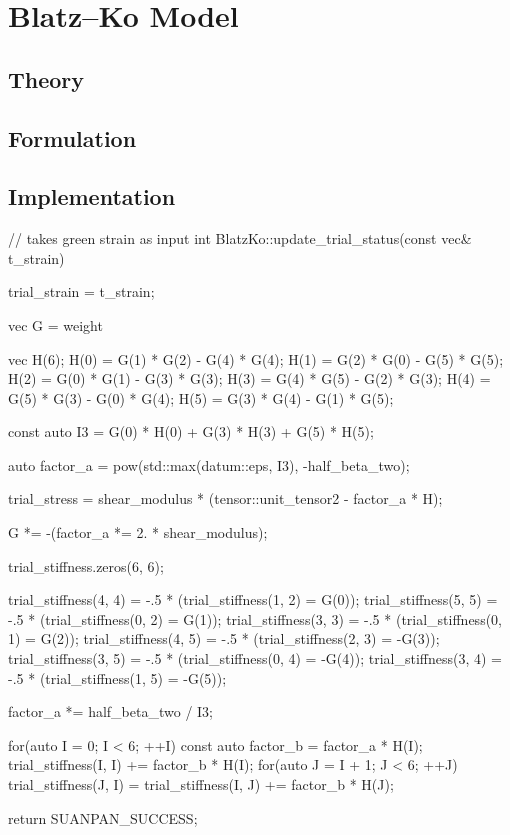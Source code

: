 \section{Blatz--Ko Model}
\subsection{Theory}
\subsection{Formulation}
\subsection{Implementation}
\begin{cppcode}
// takes green strain as input
int BlatzKo::update_trial_status(const vec& t_strain) {
    trial_strain = t_strain;

    vec G = weight %

    vec H(6);
    H(0) = G(1) * G(2) - G(4) * G(4);
    H(1) = G(2) * G(0) - G(5) * G(5);
    H(2) = G(0) * G(1) - G(3) * G(3);
    H(3) = G(4) * G(5) - G(2) * G(3);
    H(4) = G(5) * G(3) - G(0) * G(4);
    H(5) = G(3) * G(4) - G(1) * G(5);

    const auto I3 = G(0) * H(0) + G(3) * H(3) + G(5) * H(5);

    auto factor_a = pow(std::max(datum::eps, I3), -half_beta_two);

    trial_stress = shear_modulus * (tensor::unit_tensor2 - factor_a * H);

    G *= -(factor_a *= 2. * shear_modulus);

    trial_stiffness.zeros(6, 6);

    trial_stiffness(4, 4) = -.5 * (trial_stiffness(1, 2) = G(0));
    trial_stiffness(5, 5) = -.5 * (trial_stiffness(0, 2) = G(1));
    trial_stiffness(3, 3) = -.5 * (trial_stiffness(0, 1) = G(2));
    trial_stiffness(4, 5) = -.5 * (trial_stiffness(2, 3) = -G(3));
    trial_stiffness(3, 5) = -.5 * (trial_stiffness(0, 4) = -G(4));
    trial_stiffness(3, 4) = -.5 * (trial_stiffness(1, 5) = -G(5));

    factor_a *= half_beta_two / I3;

    for(auto I = 0; I < 6; ++I) {
        const auto factor_b = factor_a * H(I);
        trial_stiffness(I, I) += factor_b * H(I);
        for(auto J = I + 1; J < 6; ++J) trial_stiffness(J, I) = trial_stiffness(I, J) += factor_b * H(J);
    }

    return SUANPAN_SUCCESS;
}
\end{cppcode}
